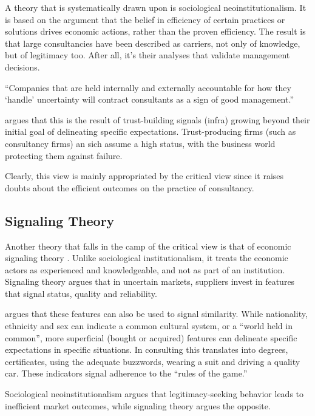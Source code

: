 \documentclass[12pt]{article}
\begin{document}
A theory that is systematically drawn upon \citep[ 6-8]{armbruster2006}
is sociological neoinstitutionalism. It is based on the argument that
the belief in efficiency of certain practices or solutions drives
economic actions, rather than the proven efficiency. The result is that
large consultancies have been described as carriers, not only of
knowledge, but of legitimacy too. After all, it's their analyses that
validate management decisions.

``Companies that are held internally and externally accountable for how
they `handle' uncertainty will contract consultants as a sign of good
management.'' \citep[ 69]{kieser2006}

\citet[20-21]{zucker1985} argues that this is the result of
trust-building signals (infra) growing beyond their initial goal of
delineating specific expectations. Trust-producing firms (such as
consultancy firms) an sich assume a high status, with the business world
protecting them against failure.

Clearly, this view is mainly appropriated by the critical view since it
raises doubts about the efficient outcomes on the practice of
consultancy.

\hypertarget{signaling-theory}{%
\subsection{Signaling Theory}\label{signaling-theory}}

Another theory that falls in the camp of the critical view is that of
economic signaling theory \citep[ 8-10]{armbruster2006}. Unlike
sociological institutionalism, it treats the economic actors as
experienced and knowledgeable, and not as part of an institution.
Signaling theory argues that in uncertain markets, suppliers invest in
features that signal status, quality and reliability.

\citet[15-16]{zucker1985} argues that these features can also be used to
signal similarity. While nationality, ethnicity and sex can indicate a
common cultural system, or a ``world held in common'', more superficial
(bought or acquired) features can delineate specific expectations in
specific situations. In consulting this translates into degrees,
certificates, using the adequate buzzwords, wearing a suit and driving a
quality car. These indicators signal adherence to the ``rules of the
game.''

Sociological neoinstitutionalism argues that legitimacy-seeking behavior
leads to inefficient market outcomes, while signaling theory argues the
opposite.
\end{document}
